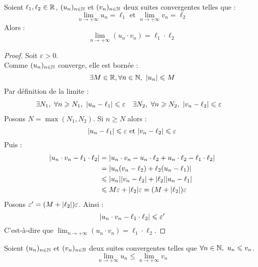 \begin{theorem}
    Soient $\ell_1, \ell_2 \in \mathbb{R}$, $(u_n)_{n \in \mathbb{N}}$ et $(v_n)_{n \in \mathbb{N}}$ deux suites convergentes telles que :
    \[ \lim_{n \to + \infty} u_n = \ell_1 \text{ et } \lim_{n \to +\infty} v_n = \ell_2 \]
    Alors :
    \[ \lim_{n \to +\infty} (u_n \cdot v_n) = \ell_1 \cdot \ell_2 \]
\end{theorem}

\begin{proof}
    Soit $\varepsilon > 0$.
    \\
    Comme $(u_n)_{n \in \mathbb{N}}$ converge, elle est bornée :
    \[ \exists M \in \mathbb{R}, \forall n \in \mathbb{N},\ \abs{u_n} \leqslant M \]
    Par définition de la limite :
    \begin{align*}
        &\exists N_1,\ \forall n \geqslant N_1,\ \abs{u_n - \ell_1} \leqslant \varepsilon &
        &\exists N_2,\ \forall n \geqslant N_2,\ \abs{v_n - \ell_2} \leqslant \varepsilon
    \end{align*}
    Posons $N = \max(N_1, N_2)$. Si $n \geq N$ alors :
    \[ \abs{u_n - \ell_1} \leqslant \varepsilon \text{ et } \abs{v_n - \ell_2} \leqslant \varepsilon \]
    Puis : 
    \begin{align*}
        \abs{u_n \cdot v_n - \ell_1 \cdot \ell_2} &= \abs{u_n \cdot v_n - u_n \cdot \ell_2 + u_n \cdot \ell_2 - \ell_1 \cdot \ell_2} \\
        &= \abs{u_n(v_n - \ell_2) + \ell_2 (u_n - \ell_1)} \\ 
        &\leqslant \abs{u_n} \abs{v_n - \ell_2} + \abs{\ell_2} \abs{u_n - \ell_1} \\ 
        &\leqslant M \varepsilon + \abs{\ell_2} \varepsilon = (M + \abs{\ell_2}) \varepsilon
    \end{align*}
    Posons $\varepsilon' = (M + \abs{\ell_2}) \varepsilon$. Ainsi :
    \[ \abs{u_n \cdot v_n - \ell_1 \cdot \ell_2} \leqslant \varepsilon' \]
    C'est-à-dire que $\lim_{n \to +\infty} (u_n \cdot v_n) = \ell_1 \cdot \ell_2$.
\end{proof}

\begin{theorem}
    Soient $(u_n)_{n \in \mathbb{N}}$ et $(v_n)_{n \in \mathbb{N}}$ deux suites convergentes telles que $\forall n \in \mathbb{N},\ u_n \leqslant v_n$. 
    \[ \lim_{n \to +\infty} u_n \leq \lim_{n \to +\infty} v_n \]
\end{theorem}

